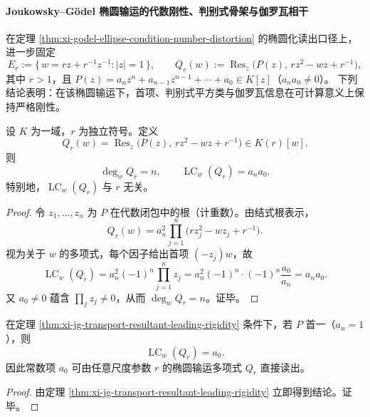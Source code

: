 \paragraph{Joukowsky--Gödel 椭圆输运的代数刚性、判别式骨架与伽罗瓦相干}
在定理 \ref{thm:xi-godel-ellipse-condition-number-distortion} 的椭圆化读出口径上，进一步固定
\[
E_r:=\{\,w=r z+r^{-1}z^{-1}:|z|=1\,\},\qquad
Q_r(w):=\operatorname{Res}_z\!\bigl(P(z),\,r z^2-w z+r^{-1}\bigr),
\]
其中 \(r>1\)，且 \(P(z)=a_n z^n+a_{n-1}z^{n-1}+\cdots+a_0\in K[z]\)（\(a_n a_0\neq 0\)）。
下列结论表明：在该椭圆输运下，首项、判别式平方类与伽罗瓦信息在可计算意义上保持严格刚性。

\begin{theorem}[输运结式的首项系数刚性]\label{thm:xi-jg-transport-resultant-leading-rigidity}
设 \(K\) 为一域，\(r\) 为独立符号。定义
\[
Q_r(w)=\operatorname{Res}_z\!\bigl(P(z),\,r z^2-w z+r^{-1}\bigr)\in K(r)[w].
\]
则
\[
\deg_w Q_r=n,\qquad
\operatorname{LC}_w(Q_r)=a_n a_0.
\]
特别地，\(\operatorname{LC}_w(Q_r)\) 与 \(r\) 无关。
\end{theorem}
\begin{proof}
令 \(z_1,\dots,z_n\) 为 \(P\) 在代数闭包中的根（计重数）。由结式根表示，
\[
Q_r(w)=a_n^{2}\prod_{j=1}^{n}\bigl(r z_j^2-w z_j+r^{-1}\bigr).
\]
视为关于 \(w\) 的多项式，每个因子给出首项 \((-z_j)w\)，故
\[
\operatorname{LC}_w(Q_r)=a_n^{2}(-1)^n\prod_{j=1}^n z_j
=a_n^{2}(-1)^n\cdot (-1)^n\frac{a_0}{a_n}
=a_n a_0.
\]
又 \(a_0\neq 0\) 蕴含 \(\prod_j z_j\neq 0\)，从而 \(\deg_w Q_r=n\)。证毕。
\end{proof}

\begin{corollary}[首一情形下的边界常数读出]\label{cor:xi-jg-monic-boundary-readout}
在定理 \ref{thm:xi-jg-transport-resultant-leading-rigidity} 条件下，若 \(P\) 首一（\(a_n=1\)），则
\[
\operatorname{LC}_w(Q_r)=a_0.
\]
因此常数项 \(a_0\) 可由任意尺度参数 \(r\) 的椭圆输运多项式 \(Q_r\) 直接读出。
\end{corollary}
\begin{proof}
由定理 \ref{thm:xi-jg-transport-resultant-leading-rigidity} 立即得到结论。证毕。
\end{proof}

